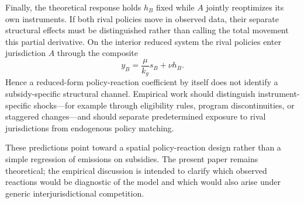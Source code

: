 Finally, the theoretical response holds $h_B$ fixed while $A$ jointly reoptimizes its own instruments. If both rival policies move in observed data, their separate structural effects must be distinguished rather than calling the total movement this partial derivative. On the interior reduced system the rival policies enter jurisdiction $A$ through the composite
\[
y_B=\frac{\mu}{k_g}s_B+\nu h_B.
\]
Hence a reduced-form policy-reaction coefficient by itself does not identify a subsidy-specific structural channel. Empirical work should distinguish instrument-specific shocks---for example through eligibility rules, program discontinuities, or staggered changes---and should separate predetermined exposure to rival jurisdictions from endogenous policy matching.

These predictions point toward a spatial policy-reaction design rather than a simple regression of emissions on subsidies. The present paper remains theoretical; the empirical discussion is intended to clarify which observed reactions would be diagnostic of the model and which would also arise under generic interjurisdictional competition.